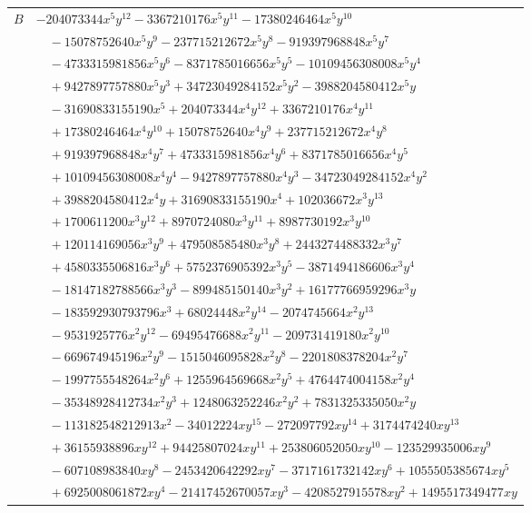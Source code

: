 \documentclass[11pt]{article}
\begin{document}
\begin{longtable}{@{}ll@{}}
$B$ & $-204073344x^{5}y^{12}-3367210176x^{5}y^{11}-17380246464x^{5}y^{10}$\\
 & $\quad -15078752640x^{5}y^{9}-237715212672x^{5}y^{8}-919397968848x^{5}y^{7}$\\
 & $\quad -4733315981856x^{5}y^{6}-8371785016656x^{5}y^{5}-10109456308008x^{5}y^{4}$\\
 & $\quad +9427897757880x^{5}y^{3}+34723049284152x^{5}y^{2}-3988204580412x^{5}y$\\
 & $\quad -31690833155190x^{5}+204073344x^{4}y^{12}+3367210176x^{4}y^{11}$\\
 & $\quad +17380246464x^{4}y^{10}+15078752640x^{4}y^{9}+237715212672x^{4}y^{8}$\\
 & $\quad +919397968848x^{4}y^{7}+4733315981856x^{4}y^{6}+8371785016656x^{4}y^{5}$\\
 & $\quad +10109456308008x^{4}y^{4}-9427897757880x^{4}y^{3}-34723049284152x^{4}y^{2}$\\
 & $\quad +3988204580412x^{4}y+31690833155190x^{4}+102036672x^{3}y^{13}$\\
 & $\quad +1700611200x^{3}y^{12}+8970724080x^{3}y^{11}+8987730192x^{3}y^{10}$\\
 & $\quad +120114169056x^{3}y^{9}+479508585480x^{3}y^{8}+2443274488332x^{3}y^{7}$\\
 & $\quad +4580335506816x^{3}y^{6}+5752376905392x^{3}y^{5}-3871494186606x^{3}y^{4}$\\
 & $\quad -18147182788566x^{3}y^{3}-899485150140x^{3}y^{2}+16177766959296x^{3}y$\\
 & $\quad -183592930793796x^{3}+68024448x^{2}y^{14}-2074745664x^{2}y^{13}$\\
 & $\quad -9531925776x^{2}y^{12}-69495476688x^{2}y^{11}-209731419180x^{2}y^{10}$\\
 & $\quad -669674945196x^{2}y^{9}-1515046095828x^{2}y^{8}-2201808378204x^{2}y^{7}$\\
 & $\quad -1997755548264x^{2}y^{6}+1255964569668x^{2}y^{5}+4764474004158x^{2}y^{4}$\\
 & $\quad -35348928412734x^{2}y^{3}+1248063252246x^{2}y^{2}+7831325335050x^{2}y$\\
 & $\quad -113182548212913x^{2}-34012224xy^{15}-272097792xy^{14}+3174474240xy^{13}$\\
 & $\quad +36155938896xy^{12}+94425807024xy^{11}+253806052050xy^{10}-123529935006xy^{9}$\\
 & $\quad -607108983840xy^{8}-2453420642292xy^{7}-3717161732142xy^{6}+1055505385674xy^{5}$\\
 & $\quad +6925008061872xy^{4}-21417452670057xy^{3}-4208527915578xy^{2}+1495517349477xy$\\

\end{longtable}
\end{document}
